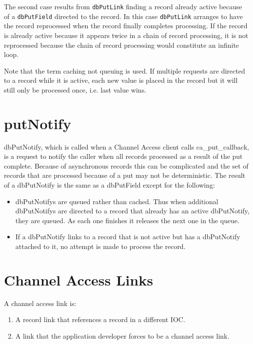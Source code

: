 The second case results from \verb|dbPutLink| finding a record already active because of a \verb|dbPutField| directed to the 
record. In this case \verb|dbPutLink| arranges to have the record reprocessed when the record finally completes processing. If 
the record is already active because it appears twice in a chain of record processing, it is not reprocessed because the chain 
of record processing would constitute an infinite loop.

Note that the term caching not queuing is used. If multiple requests are directed to a record while it is active, each new 
value is placed in the record but it will still only be processed once, i.e. last value wins.

\section{putNotify}

dbPutNotify, which is called when a Channel Access client calls ca\_put\_callback, is a request to notify the caller when all 
records processed as a result of the put complete. Because of asynchronous records this can be complicated and the set of 
records that are processed because of a put may not be deterministic. The result of a dbPutNotify is the same as a 
dbPutField except for the following:

\begin{itemize}
\item dbPutNotifys are queued rather than cached. Thus when additional dbPutNotifys are directed to a record that 
already has an active dbPutNotify, they are queued. As each one finishes it releases the next one in the queue.

\item If a dbPutNotify links to a record that is not active but has a dbPutNotify attached to it, no attempt is made to 
process the record.

\end{itemize}

\section{Channel Access Links}

A channel access link is:

\begin{enumerate}
\item A record link that references a record in a different IOC.

\item A link that the application developer forces to be a channel access link.

\end{enumerate}

